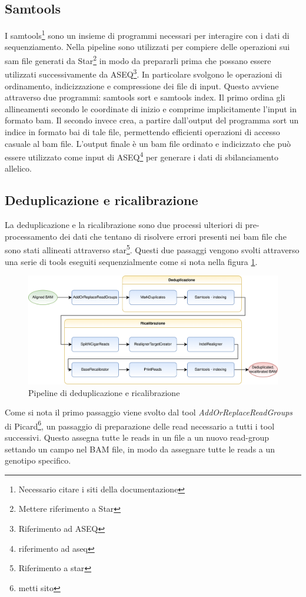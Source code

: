 	\subsection{Samtools}
  I samtools\footnote{Necessario citare i siti della documentazione} sono un insieme di programmi necessari per interagire con i dati di sequenziamento.
  Nella pipeline sono utilizzati per compiere delle operazioni sui sam file generati da Star\footnote{Mettere riferimento a Star} in modo da prepararli prima che possano essere utilizzati successivamente da ASEQ\footnote{Riferimento ad ASEQ}.
  In particolare svolgono le operazioni di ordinamento, indicizzazione e compressione dei file di input.
  Questo avviene attraverso due programmi: samtools sort e samtools index.
  Il primo ordina gli allineamenti secondo le coordinate di inizio e comprime implicitamente l'input in formato bam.
  Il secondo invece crea, a partire dall'output del programma sort un indice in formato bai di tale file, permettendo efficienti operazioni di accesso casuale al bam file.
  L'output finale \`e un bam file ordinato e indicizzato che pu\`o essere utilizzato come input di ASEQ\footnote{riferimento ad aseq} per generare i dati di sbilanciamento allelico.

	\subsection{Deduplicazione e ricalibrazione}
  La deduplicazione e la ricalibrazione sono due processi ulteriori di pre-processamento dei dati che tentano di risolvere errori presenti nei bam file che sono stati allineati attraverso star\footnote{Riferimento a star}.
  Questi due passaggi vengono svolti attraverso una serie di tools eseguiti sequenzialmente come si nota nella figura \ref{fig:pipeline_deduprecal}.
  \begin{figure}[H]
    \label{fig:pipeline_deduprecal}
    \centering
    \includegraphics[scale=0.17]{deduprecal.png}
    \caption{Pipeline di deduplicazione e ricalibrazione}
  \end{figure}
  Come si nota il primo passaggio viene svolto dal tool \emph{AddOrReplaceReadGroups} di Picard\footnote{metti sito}, un passaggio di preparazione delle read necessario a tutti i tool successivi.
  Questo assegna tutte le reads in un file a un nuovo read-group settando un campo nel BAM file, in modo da assegnare tutte le reads a un genotipo specifico.


